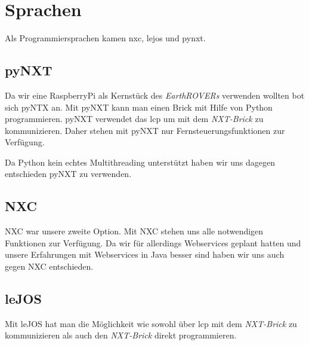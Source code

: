 \chapter{Sprachen}
Als Programmiersprachen kamen \gls{nxc}, \gls{lejos} und \gls{pynxt}. 

\section{pyNXT}
Da wir eine RaspberryPi als Kernstück des \textit{EarthROVERs} verwenden wollten bot sich pyNTX an. Mit pyNXT kann man einen Brick mit Hilfe von Python programmieren. pyNXT verwendet das \gls{lcp} um mit dem \textit{NXT-Brick} zu kommunizieren. Daher stehen mit pyNXT nur Fernsteuerungsfunktionen zur Verfügung.


Da Python kein echtes Multithreading unterstützt haben wir uns dagegen entschieden pyNXT zu verwenden.

\section{NXC}
NXC war unsere zweite Option. Mit NXC stehen uns alle notwendigen Funktionen zur Verfügung. Da wir für allerdings Webservices geplant hatten und unsere Erfahrungen mit Webservices in Java besser sind haben wir uns auch gegen NXC entschieden.

\section{leJOS}
Mit leJOS hat man die Möglichkeit wie sowohl über \gls{lcp} mit dem \textit{NXT-Brick} zu kommunizieren als auch den \textit{NXT-Brick} direkt programmieren. 
